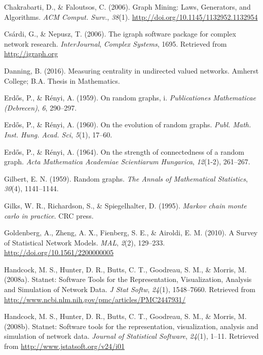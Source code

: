 \documentclass[12pt,twoside]{amherstthesis}
\begin{document}
  \hypertarget{ref-chakrabarti_graph_2006}{}
  Chakrabarti, D., \& Faloutsos, C. (2006). Graph Mining: Laws,
  Generators, and Algorithms. \emph{ACM Comput. Surv.}, \emph{38}(1).
  \url{http://doi.org/10.1145/1132952.1132954}
  
  \hypertarget{ref-igraphpackage}{}
  Csárdi, G., \& Nepusz, T. (2006). The igraph software package for
  complex network research. \emph{InterJournal}, \emph{Complex Systems},
  1695. Retrieved from \url{http://igraph.org}
  
  \hypertarget{ref-beckydanning}{}
  Danning, B. (2016). Measuring centrality in undirected valued networks.
  Amherst College; B.A. Thesis in Mathematics.
  
  \hypertarget{ref-erdos1959random}{}
  Erd\H{o}s, P., \& Rényi, A. (1959). On random graphs, i.
  \emph{Publicationes Mathematicae (Debrecen)}, \emph{6}, 290--297.
  
  \hypertarget{ref-erdos1960evolution}{}
  Erd\H{o}s, P., \& Rényi, A. (1960). On the evolution of random graphs.
  \emph{Publ. Math. Inst. Hung. Acad. Sci}, \emph{5}(1), 17--60.
  
  \hypertarget{ref-erdHos1964strength}{}
  Erd\H{o}s, P., \& Rényi, A. (1964). On the strength of connectedness of
  a random graph. \emph{Acta Mathematica Academiae Scientiarum Hungarica},
  \emph{12}(1-2), 261--267.
  
  \hypertarget{ref-gilbert1959random}{}
  Gilbert, E. N. (1959). Random graphs. \emph{The Annals of Mathematical
  Statistics}, \emph{30}(4), 1141--1144.
  
  \hypertarget{ref-gilks1995markov}{}
  Gilks, W. R., Richardson, S., \& Spiegelhalter, D. (1995). \emph{Markov
  chain monte carlo in practice}. CRC press.
  
  \hypertarget{ref-goldenberg_survey_2010}{}
  Goldenberg, A., Zheng, A. X., Fienberg, S. E., \& Airoldi, E. M. (2010).
  A Survey of Statistical Network Models. \emph{MAL}, \emph{2}(2),
  129--233. \url{http://doi.org/10.1561/2200000005}
  
  \hypertarget{ref-handcock_statnet:_2008}{}
  Handcock, M. S., Hunter, D. R., Butts, C. T., Goodreau, S. M., \&
  Morris, M. (2008a). Statnet: Software Tools for the Representation,
  Visualization, Analysis and Simulation of Network Data. \emph{J Stat
  Softw}, \emph{24}(1), 1548--7660. Retrieved from
  \url{http://www.ncbi.nlm.nih.gov/pmc/articles/PMC2447931/}
  
  \hypertarget{ref-statnetpackagearticle}{}
  Handcock, M. S., Hunter, D. R., Butts, C. T., Goodreau, S. M., \&
  Morris, M. (2008b). Statnet: Software tools for the representation,
  visualization, analysis and simulation of network data. \emph{Journal of
  Statistical Software}, \emph{24}(1), 1--11. Retrieved from
  \url{http://www.jstatsoft.org/v24/i01}
  
\end{document}
